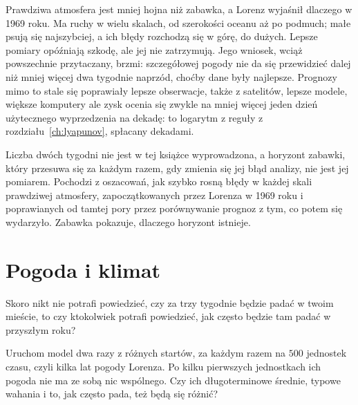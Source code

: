 Prawdziwa atmosfera jest mniej hojna niż zabawka, a Lorenz wyjaśnił dlaczego
w 1969 roku. Ma ruchy w wielu skalach, od szerokości oceanu aż po podmuch;
małe psują się najszybciej, a ich błędy rozchodzą się w górę, do dużych.
Lepsze pomiary opóźniają szkodę, ale jej nie zatrzymują. Jego wniosek, wciąż
powszechnie przytaczany, brzmi: szczegółowej pogody nie da się przewidzieć
dalej niż mniej więcej dwa tygodnie naprzód, choćby dane były najlepsze.
Prognozy mimo to stale się poprawiały \dash{} lepsze obserwacje, także z
satelitów, lepsze modele, większe komputery \dash{} ale zysk ocenia się
zwykle na mniej więcej jeden dzień użytecznego wyprzedzenia na dekadę: to
logarytm z reguły z rozdziału~\ref{ch:lyapunov}, spłacany dekadami.

\begin{rigourbox}
Liczba dwóch tygodni nie jest w tej książce wyprowadzona, a horyzont
zabawki, który przesuwa się za każdym razem, gdy zmienia się jej błąd
analizy, nie jest jej pomiarem. Pochodzi z oszacowań, jak szybko rosną błędy
w każdej skali prawdziwej atmosfery, zapoczątkowanych przez Lorenza w 1969
roku i poprawianych od tamtej pory przez porównywanie prognoz z tym, co potem
się wydarzyło. Zabawka pokazuje, dlaczego horyzont istnieje.
\end{rigourbox}

\section{Pogoda i klimat}
\label{sec:ch14-climate}

\noindent
Skoro nikt nie potrafi powiedzieć, czy za trzy tygodnie będzie padać w twoim
mieście, to czy ktokolwiek potrafi powiedzieć, jak często będzie tam padać w
przyszłym roku?

\begin{think}
Uruchom model dwa razy z różnych startów, za każdym razem na $500$ jednostek
czasu, czyli kilka lat pogody Lorenza. Po kilku pierwszych jednostkach ich
pogoda nie ma ze sobą nic wspólnego. Czy ich długoterminowe średnie, typowe
wahania i to, jak często pada, też będą się różnić?
\end{think}


